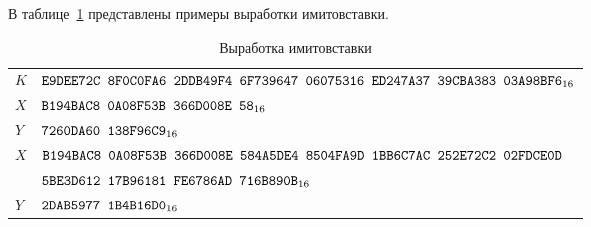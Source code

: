 \label{TEST.MAC}

В таблице~\ref{Table.TEST.MAC} представлены примеры выработки имитовставки.

\begin{table}[H]
\caption{Выработка имитовставки}\label{Table.TEST.MAC}
\begin{tabular}{|l|l|}
\hline
$K$ & 
$\texttt{E9DEE72C~8F0C0FA6~2DDB49F4~6F739647~06075316~ED247A37~39CBA383~03A98BF6}_{16}$\\
\ddhline
$X$ &
$\texttt{B194BAC8~0A08F53B~366D008E~58}_{16}$\\
\dhline
$Y$ &
$\texttt{7260DA60~138F96C9}_{16}$\\
\ddhline
$X$ &
$\texttt{B194BAC8~0A08F53B~366D008E~584A5DE4~8504FA9D~1BB6C7AC~252E72C2~02FDCE0D}$\\
&
$\texttt{5BE3D612~17B96181~FE6786AD~716B890B}_{16}$\\
\dhline
$Y$ &
$\texttt{2DAB5977~1B4B16D0}_{16}$\\
\hline
\end{tabular}
\end{table}
